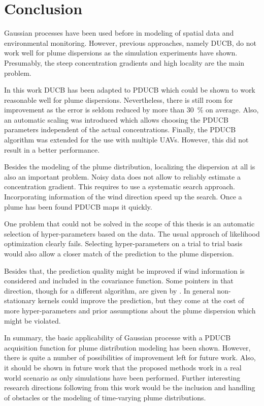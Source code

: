 \chapter{Conclusion}
Gaussian processes have been used before in modeling of spatial data and 
environmental monitoring. However, previous approaches, namely DUCB, do not work 
well for plume dispersions as the simulation experiments have shown. Presumably, 
the steep concentration gradients and high locality are the main problem.

In this work DUCB has been adapted to PDUCB which could be shown to work 
reasonable well for plume dispersions. Nevertheless, there is still room for 
improvement as the error is seldom reduced by more than \SI{30}{\percent} on 
average. Also, an automatic scaling was introduced which allows choosing the 
PDUCB parameters independent of the actual concentrations. Finally, the PDUCB 
algorithm was extended for the use with multiple UAVs. However, this did not 
result in a better performance.

Besides the modeling of the plume distribution, localizing the dispersion at 
all is also an important problem. Noisy data does not allow to reliably estimate 
a concentration gradient. This requires to use a systematic search approach.  
Incorporating information of the wind direction speed up the search. Once 
a plume has been found PDUCB maps it quickly.

One problem that could not be solved in the scope of this thesis is an automatic 
selection of hyper-parameters based on the data. The usual approach of 
likelihood optimization clearly fails. Selecting hyper-parameters on a trial to 
trial basis would also allow a closer match of the prediction to the plume 
dispersion.

Besides that, the prediction quality might be improved if wind information is 
considered and included in the covariance function. Some pointers in that 
direction, though for a different algorithm, are given by 
\textcite{Reggente:2009ti}. In general non-stationary kernels could improve the 
prediction, but they come at the cost of more hyper-parameters and prior 
assumptions about the plume dispersion which might be violated.

In summary, the basic applicability of Gaussian processe with a PDUCB 
acquisition function for plume distribution modeling has been shown. However, 
there is quite a number of possibilities of improvement left for future work.  
Also, it should be shown in future work that the proposed methods work in a real 
world scenario as only simulations have been performed. Further interesting 
research directions following from this work would be the inclusion and handling 
of obstacles or the modeling of time-varying plume distributions.

